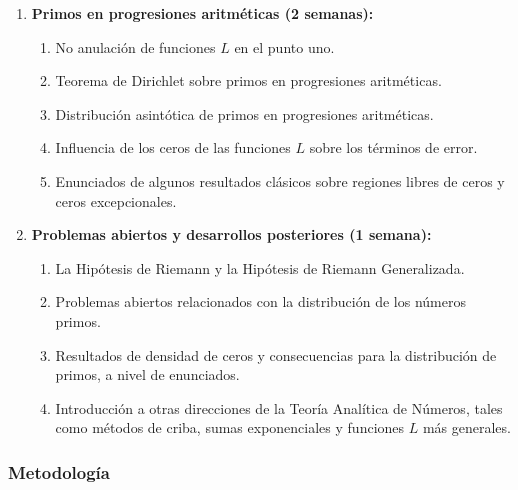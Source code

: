 \begin{refsection}
\begin{enumerate}
\item \textbf{Primos en progresiones aritméticas (2 semanas):}
\begin{enumerate}
\item No anulación de funciones $L$ en el punto uno.
\item Teorema de Dirichlet sobre primos en progresiones aritméticas.
\item Distribución asintótica de primos en progresiones aritméticas.
\item Influencia de los ceros de las funciones $L$ sobre los términos de error.
\item Enunciados de algunos resultados clásicos sobre regiones libres de ceros y ceros excepcionales.
\end{enumerate}

\item \textbf{Problemas abiertos y desarrollos posteriores (1 semana):}
\begin{enumerate}
\item La Hipótesis de Riemann y la Hipótesis de Riemann Generalizada.
\item Problemas abiertos relacionados con la distribución de los números primos.
\item Resultados de densidad de ceros y consecuencias para la distribución de primos, a nivel de enunciados.
\item Introducción a otras direcciones de la Teoría Analítica de Números, tales como métodos de criba, sumas exponenciales y funciones $L$ más generales.
\end{enumerate}

\end{enumerate}

\subsubsection*{Metodología}


\end{refsection}
